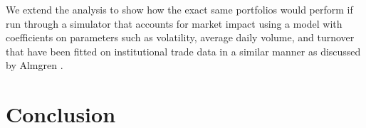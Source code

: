 \documentclass[british]{amsart} \usepackage{lmodern}
\numberwithin{equation}{section} \numberwithin{figure}{section}
\theoremstyle{plain} \newtheorem{thm}{\protect\theoremname}[section]
\theoremstyle{definition} \newtheorem{defn}[thm]{\protect\definitionname}
\theoremstyle{plain} \newtheorem{assumption}[thm]{\protect\assumptionname}
\theoremstyle{plain} \newtheorem{lem}[thm]{\protect\lemmaname}
\theoremstyle{plain} \newtheorem{prop}[thm]{\protect\propositionname}
\theoremstyle{remark} \newtheorem{rem}[thm]{\protect\remarkname}
\theoremstyle{plain} \newtheorem{cor}[thm]{\protect\corollaryname}
\begin{document}
We extend the analysis to show how the exact same portfolios would perform if
run through a simulator that accounts for market impact using a model with
coefficients on parameters such as volatility, average daily volume, and
turnover that have been fitted on institutional trade data in a similar manner
as discussed by Almgren \cite{almgren2005direct}.




\newpage
\section{Conclusion}



\newpage
\printbibliography
\end{document}
